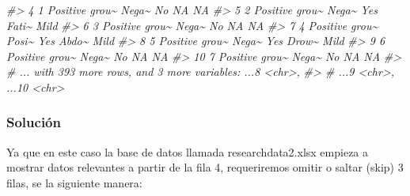 \documentclass[
]{book}
\newenvironment{Shaded}{\begin{snugshade}}{\end{snugshade}}
\newcommand{\CommentTok}[1]{\textcolor[rgb]{0.56,0.35,0.01}{\textit{#1}}}
\begin{document}
\begin{Shaded}
\begin{Highlighting}[]
\CommentTok{\#\textgreater{}  4 1          Positive         grou\textasciitilde{} Nega\textasciitilde{} No    NA    NA   }
\CommentTok{\#\textgreater{}  5 2          Positive         grou\textasciitilde{} Nega\textasciitilde{} Yes   Fati\textasciitilde{} Mild }
\CommentTok{\#\textgreater{}  6 3          Positive         grou\textasciitilde{} Nega\textasciitilde{} No    NA    NA   }
\CommentTok{\#\textgreater{}  7 4          Positive         grou\textasciitilde{} Posi\textasciitilde{} Yes   Abdo\textasciitilde{} Mild }
\CommentTok{\#\textgreater{}  8 5          Positive         grou\textasciitilde{} Nega\textasciitilde{} Yes   Drow\textasciitilde{} Mild }
\CommentTok{\#\textgreater{}  9 6          Positive         grou\textasciitilde{} Nega\textasciitilde{} No    NA    NA   }
\CommentTok{\#\textgreater{} 10 7          Positive         grou\textasciitilde{} Nega\textasciitilde{} No    NA    NA   }
\CommentTok{\#\textgreater{} \# ... with 393 more rows, and 3 more variables: ...8 \textless{}chr\textgreater{},}
\CommentTok{\#\textgreater{} \#   ...9 \textless{}chr\textgreater{}, ...10 \textless{}chr\textgreater{}}
\end{Highlighting}
\end{Shaded}

\hypertarget{soluciuxf3n}{%
\subsubsection{Solución}\label{soluciuxf3n}}

Ya que en este caso la base de datos llamada researchdata2.xlsx empieza a mostrar datos relevantes a partir de la fila 4, requeriremos omitir o saltar (skip) 3 filas, se la siguiente manera:
\end{document}
